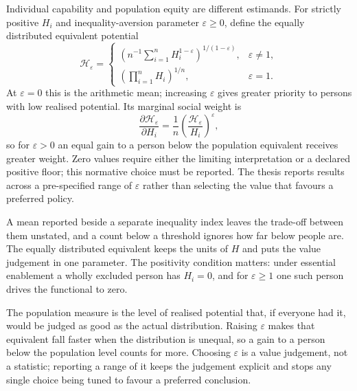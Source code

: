 Individual capability and population equity are different estimands. For
strictly positive $H_i$ and inequality-aversion parameter $\varepsilon\geq0$,
define the equally distributed equivalent potential \citep{atkinson_1970}
\begin{equation}
\mathcal H_{\varepsilon}=
\begin{cases}
\left(n^{-1}\sum_{i=1}^{n}H_i^{1-\varepsilon}\right)^{1/(1-\varepsilon)},
& \varepsilon\neq1,\\[4pt]
\left(\prod_{i=1}^{n}H_i\right)^{1/n},&\varepsilon=1.
\end{cases}
\label{eq:crf_equity_functional}
\end{equation}
At $\varepsilon=0$ this is the arithmetic mean; increasing $\varepsilon$ gives
greater priority to persons with low realised potential. Its marginal social
weight is \citep{atkinson_1970}
\begin{equation}
\frac{\partial\mathcal H_{\varepsilon}}{\partial H_i}
=\frac{1}{n}\left(\frac{\mathcal H_{\varepsilon}}{H_i}\right)^{\varepsilon},
\label{eq:crf_social_weight}
\end{equation}
so for $\varepsilon>0$ an equal gain to a person below the population equivalent
receives greater weight. Zero values require either the limiting interpretation
or a declared positive floor; this normative choice must be reported. The thesis
reports results across a pre-specified range of $\varepsilon$ rather than selecting
the value that favours a preferred policy.

A mean reported beside a separate inequality index leaves the trade-off
between them unstated, and a count below a threshold ignores how far below
people are. The equally distributed equivalent keeps the units of $H$ and puts
the value judgement in one parameter. The positivity condition matters: under
essential enablement a wholly excluded person has $H_i=0$, and for
$\varepsilon\geq1$ one such person drives the functional to zero.

\begin{reading}
The population measure is the level of realised potential that, if everyone had it,
would be judged as good as the actual distribution. Raising $\varepsilon$ makes that
equivalent fall faster when the distribution is unequal, so a gain to a person below
the population level counts for more. Choosing $\varepsilon$ is a value judgement,
not a statistic; reporting a range of it keeps the judgement explicit and stops any
single choice being tuned to favour a preferred conclusion.
\end{reading}

